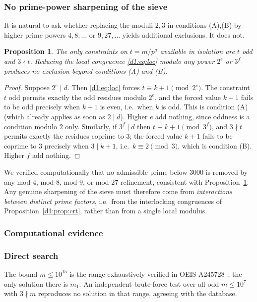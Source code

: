 \documentclass[a4paper]{article}
\theoremstyle{plain}
\newtheorem{proposition}{Proposition}[subsection]
\theoremstyle{definition}
\theoremstyle{remark}
\begin{document}
\subsubsection{No prime-power sharpening of the sieve}\label{d1:sec:nosharp}

It is natural to ask whether replacing the moduli $2,3$ in conditions (A),(B) by higher prime
powers $4,8,\dots$ or $9,27,\dots$ yields additional exclusions. It does not.

\begin{proposition}\label{d1:prop:nosharp}
The only constraints on $t=m/p^{a}$ available in isolation are $t$ odd and $3\nmid t$. Reducing
the local congruence \eqref{d1:eq:loc} modulo any power $2^{e}$ or $3^{f}$ produces no exclusion
beyond conditions \textup{(A)} and \textup{(B)}.
\end{proposition}

\begin{proof}
Suppose $2^{e}\mid d$. Then \eqref{d1:eq:loc} forces $t\equiv k+1\pmod{2^{e}}$. The constraint
$t$ odd permits exactly the odd residues modulo $2^{e}$, and the forced value $k+1$ fails to be
odd precisely when $k+1$ is even, i.e.\ when $k$ is odd. This is condition (A) (which already
applies as soon as $2\mid d$). Higher $e$ add nothing, since oddness is a condition modulo $2$
only. Similarly, if $3^{f}\mid d$ then $t\equiv k+1\pmod{3^{f}}$, and $3\nmid t$ permits exactly
the residues coprime to $3$; the forced value $k+1$ fails to be coprime to $3$ precisely when
$3\mid k+1$, i.e.\ $k\equiv 2\pmod 3$, which is condition (B). Higher $f$ add nothing.
\end{proof}

We verified computationally that no admissible prime below $3000$ is removed by any mod-$4$,
mod-$8$, mod-$9$, or mod-$27$ refinement, consistent with Proposition~\ref{d1:prop:nosharp}. Any
genuine sharpening of the sieve must therefore come from \emph{interactions between distinct
prime factors}, i.e.\ from the interlocking congruences of Proposition~\ref{d1:prop:crt}, rather
than from a single local modulus.

\subsubsection{Computational evidence}\label{d1:sec:comp}

\subsubsection{Direct search}
The bound $m\le 10^{15}$ is the range exhaustively verified in OEIS A245728~\cite{d1:oeis}; the only
solution there is $m_{1}$. An independent brute-force test over all odd $m\le 10^{7}$ with
$3\nmid m$ reproduces no solution in that range, agreeing with the database.
\end{document}
